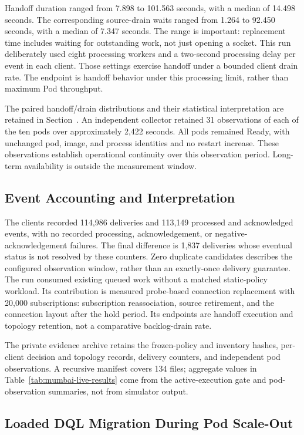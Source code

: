 Handoff duration ranged from 7.898 to 101.563 seconds, with a median of
14.498 seconds. The corresponding source-drain waits ranged from 1.264 to
92.450 seconds, with a median of 7.347 seconds. The range is important:
replacement time includes waiting for outstanding work, not just opening
a socket. This run deliberately used eight processing workers
and a two-second processing delay per event in each client. Those settings
exercise handoff under a bounded client drain rate. The endpoint is handoff
behavior under this processing limit, rather than maximum Pod throughput.

The paired handoff/drain distributions and their statistical interpretation
are retained in Section~.
An independent collector retained 31 observations of each of the ten pods
over approximately 2,422 seconds. All pods remained Ready, with unchanged
pod, image, and process identities and no restart increase. These observations
establish operational continuity over this observation period. Long-term
availability is outside the measurement window.

\subsection{Event Accounting and Interpretation}

The clients recorded 114,986 deliveries and 113,149 processed and acknowledged
events, with no recorded processing, acknowledgement, or negative-
acknowledgement failures. The final difference is 1,837 deliveries whose
eventual status is not resolved by these counters. Zero duplicate candidates
describes the configured observation window, rather than an exactly-once
delivery guarantee. The run consumed existing queued work without a matched
static-policy workload. Its contribution is measured probe-based connection
replacement with 20,000 subscriptions: subscription reassociation, source
retirement, and the connection layout after the hold period. Its endpoints
are handoff execution and topology retention, not a comparative backlog-drain
rate.

The private evidence archive retains the frozen-policy and inventory hashes,
per-client decision and topology records, delivery counters, and independent
pod observations. A recursive manifest covers 134 files; aggregate values in
Table~\ref{tab:mumbai-live-results} come from the active-execution gate and
pod-observation summaries, not from simulator output.
\subsection{Loaded DQL Migration During Pod Scale-Out}
\label{sec:live-dql-scaleout}


